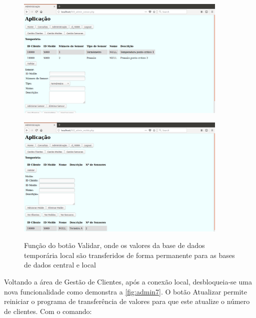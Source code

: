 \documentclass[11pt,twoside,a4paper]{report}
\begin{document}
\begin{figure}[H]
	\centering
	\begin{minipage}{.5\textwidth}
		\begin{center}
			\includegraphics[width=0.9\textwidth]{administracao07} %
			\label{fig:admin12}
		\end{center}
	\end{minipage}%
	\begin{minipage}{.5\textwidth}
		\begin{center}
			\includegraphics[width=0.9\textwidth]{administracao08} %
			\label{fig:admin13}
		\end{center}
	\end{minipage}
	\caption{Função do botão Validar, onde os valores da base de dados temporária local são transferidos de forma permanente para as bases de dados central e local}
	\label{fig:admin11}
\end{figure}
Voltando a área de Gestão de Clientes, após a conexão local, desbloqueia-se uma nova funcionalidade como demonstra a \autoref{fig:admin7}. O botão Atualizar permite reiniciar o programa de transferência de valores para que este atualize o número de clientes. Com o comando:
\end{document}
